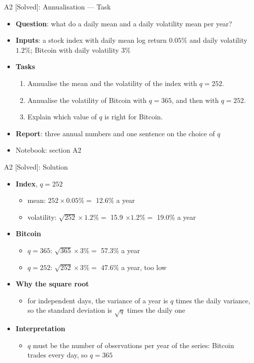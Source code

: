 \begin{frame}{A2 [Solved]: Annualisation --- Task}
\itemsize{\small}
\begin{itemize}
\item \textbf{Question}: what do a daily mean and a daily volatility mean per year?
\item \textbf{Inputs}: a stock index with daily mean log return $0.05\%$ and daily volatility $1.2\%$; Bitcoin with daily volatility $3\%$
\item \textbf{Tasks}
\begin{enumerate}
    \item Annualise the mean and the volatility of the index with $q = 252$.
    \item Annualise the volatility of Bitcoin with $q = 365$, and then with $q = 252$.
    \item Explain which value of $q$ is right for Bitcoin.
\end{enumerate}
\item \textbf{Report}: three annual numbers and one sentence on the choice of $q$
\item Notebook: section A2
\end{itemize}
\end{frame}

\begin{frame}{A2 [Solved]: Solution}
\itemsize{\small}
\begin{itemize}
    \item \textbf{Index}, $q = 252$
    \begin{itemize}
        \item mean: $252 \times 0.05\% = $ 12.6\% a year
        \item volatility: $\sqrt{252} \times 1.2\% = $ 15.9 $\times 1.2\% = $ 19.0\% a year
    \end{itemize}
    \item \textbf{Bitcoin}
    \begin{itemize}
        \item $q = 365$: $\sqrt{365} \times 3\% = $ 57.3\% a year
        \item $q = 252$: $\sqrt{252} \times 3\% = $ 47.6\% a year, too low
    \end{itemize}
    \item \textbf{Why the square root}
    \begin{itemize}
        \item for independent days, the variance of a year is $q$ times the daily variance, so the standard deviation is $\sqrt{q}$ times the daily one
    \end{itemize}
    \item \textbf{Interpretation}
    \begin{itemize}
        \item $q$ must be the number of observations per year of the series: Bitcoin trades every day, so $q = 365$
    \end{itemize}
\end{itemize}
\end{frame}

